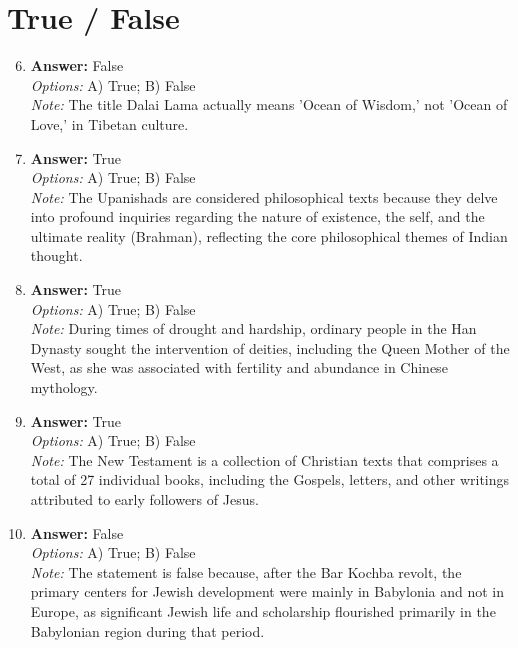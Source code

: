 \documentclass[12pt]{article}
\begin{document}
\section*{True / False}
\begin{enumerate}[label=\arabic*.]
\setcounter{enumi}{5}
\item \textbf{Answer:} False
\\ \textit{Options:} A) True; B) False
\\ \textit{Note:} The title Dalai Lama actually means 'Ocean of Wisdom,' not 'Ocean of Love,' in Tibetan culture.
\item \textbf{Answer:} True
\\ \textit{Options:} A) True; B) False
\\ \textit{Note:} The Upanishads are considered philosophical texts because they delve into profound inquiries regarding the nature of existence, the self, and the ultimate reality (Brahman), reflecting the core philosophical themes of Indian thought.
\item \textbf{Answer:} True
\\ \textit{Options:} A) True; B) False
\\ \textit{Note:} During times of drought and hardship, ordinary people in the Han Dynasty sought the intervention of deities, including the Queen Mother of the West, as she was associated with fertility and abundance in Chinese mythology.
\item \textbf{Answer:} True
\\ \textit{Options:} A) True; B) False
\\ \textit{Note:} The New Testament is a collection of Christian texts that comprises a total of 27 individual books, including the Gospels, letters, and other writings attributed to early followers of Jesus.
\item \textbf{Answer:} False
\\ \textit{Options:} A) True; B) False
\\ \textit{Note:} The statement is false because, after the Bar Kochba revolt, the primary centers for Jewish development were mainly in Babylonia and not in Europe, as significant Jewish life and scholarship flourished primarily in the Babylonian region during that period.
\end{enumerate}
\end{document}
